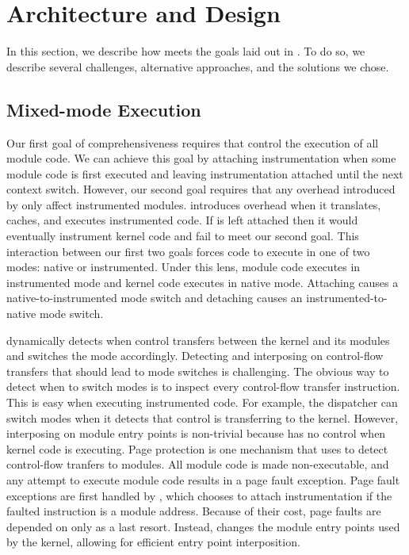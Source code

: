 \documentclass[10pt,preprint]{sigplanconf}
\begin{document}

\section{Architecture and Design} \label{sec:arch}

In this section, we describe how {\sysname} meets the goals laid out in . To do so, we describe several challenges, alternative approaches, and the solutions we chose.


\subsection{Mixed-mode Execution}
Our first goal of comprehensiveness requires that {\sysname} control the execution of all module code. We can achieve this goal by attaching instrumentation when some module code is first executed and leaving instrumentation attached until the next context switch. However, our second goal requires that any overhead introduced by {\sysname} only affect instrumented modules. {\Sysname} introduces overhead when it translates, caches, and executes instrumented code. If {\sysname} is left attached then it would eventually instrument kernel code and fail to meet our second goal. This interaction between our first two goals forces code to execute in one of two modes: native or instrumented. Under this lens, module code executes in instrumented mode and kernel code executes in native mode. Attaching {\sysname} causes a native-to-instrumented mode switch and detaching causes an instrumented-to-native mode switch.

{\Sysname} dynamically detects when control transfers between the kernel and its modules and switches the mode accordingly. Detecting and interposing on control-flow transfers that should lead to mode switches is challenging. The obvious way to detect when to switch modes is to inspect every control-flow transfer instruction. This is easy when executing instrumented code. For example, the dispatcher can switch modes when it detects that control is transferring to the kernel. However, interposing on module entry points is non-trivial because {\sysname} has no control when kernel code is executing. Page protection is one mechanism that {\sysname} uses to detect control-flow tranfers to modules. All module code is made non-executable, and any attempt to execute module code results in a page fault exception. Page fault exceptions are first handled by {\sysname}, which chooses to attach instrumentation if the faulted instruction is a module address. Because of their cost, page faults are depended on only as a last resort. Instead, {\sysname} changes the module entry points used by the kernel, allowing for efficient entry point interposition.
\end{document}

